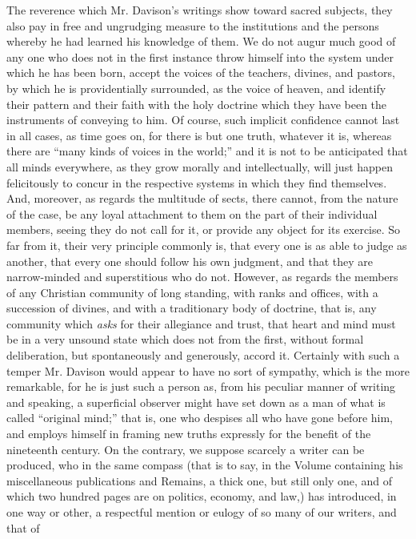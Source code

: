 The reverence which Mr. Davison's writings show
toward sacred subjects, they also pay in free and ungrudging measure
to the institutions and the persons whereby he had learned his
knowledge of them. We do not augur much good of any one who does not
in the first instance throw himself into the system under which he has
been born, accept the voices of the teachers, divines, and pastors, by
which he is providentially surrounded, as the voice of heaven, and
identify their pattern and their faith with the holy doctrine which
they have been the instruments of conveying to him. Of course, such
implicit confidence cannot last in all cases, as time goes on,
for there is but one truth, whatever it is, whereas there are ``many
kinds of voices in the world;'' and it is not to be anticipated that
all minds everywhere, as they grow morally and intellectually, will
just happen felicitously to concur in the respective systems in which
they find themselves. And, moreover, as regards the multitude of
sects, there cannot, from the nature of the case, be any loyal
attachment to them on the part of their individual members, seeing
they do not call for it, or provide any object for its exercise. So
far from it, their very principle commonly is, that every one is as
able to judge as another, that every one should follow his own
judgment, and that they are narrow-minded and superstitious who do
not. However, as regards the members of any Christian community of
long standing, with ranks and offices, with a succession of divines,
and with a traditionary body of doctrine, that is, any community which
\emph{asks} for their allegiance and trust, that heart and mind must
be in a very unsound state which does not from the first, without
formal deliberation, but spontaneously and generously, accord it.
Certainly with such a temper Mr. Davison would appear to have no sort
of sympathy, which is the more remarkable, for he is just such a
person as, from his peculiar manner of writing and speaking, a
superficial observer might have set down as a man of what is called ``original
mind;'' that is, one who despises all who have gone before him, and
employs himself in framing new truths expressly for the benefit of the
nineteenth century. On the contrary, we suppose scarcely a writer can
be produced, who in the same compass (that is to say, in the Volume
containing his miscellaneous publications and Remains, a thick one,
but still only one, and of which two hundred pages are on politics, economy, and law,) has introduced, in one way or other, a
respectful mention or eulogy of so many of our writers, and that of
